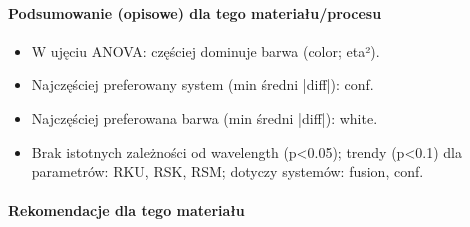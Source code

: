 \documentclass[
  10pt,
]{article}
\begin{document}
\paragraph{Podsumowanie (opisowe) dla tego materiału/procesu}
\begin{itemize}
\item W ujęciu ANOVA: częściej dominuje barwa (color; eta²).
\item Najczęściej preferowany system (min średni |diff|): conf.
\item Najczęściej preferowana barwa (min średni |diff|): white.
\item Brak istotnych zależności od wavelength (p<0.05); trendy (p<0.1) dla parametrów: RKU, RSK, RSM; dotyczy systemów: fusion, conf.
\end{itemize}
\paragraph{Rekomendacje dla tego materiału}
\end{document}
